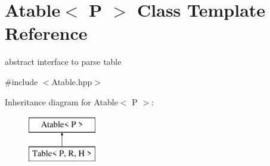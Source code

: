 \hypertarget{classAtable}{}\section{Atable$<$ P $>$ Class Template Reference}
\label{classAtable}


abstract interface to parse table  




{\ttfamily \#include $<$Atable.\+hpp$>$}

Inheritance diagram for Atable$<$ P $>$\+:\begin{figure}[H]
\begin{center}
\leavevmode
\includegraphics[height=2.000000cm]{classAtable}
\end{center}
\end{figure}

